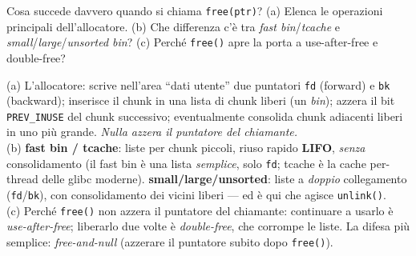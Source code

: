 \question[6]
Cosa succede davvero quando si chiama \lstinline|free(ptr)|? (a) Elenca le operazioni principali dell'allocatore. (b) Che differenza c'è tra \emph{fast bin}/\emph{tcache} e \emph{small}/\emph{large}/\emph{unsorted bin}? (c) Perché \lstinline|free()| apre la porta a use-after-free e double-free?
\begin{solution}
(a) L'allocatore: scrive nell'area ``dati utente'' due puntatori \lstinline|fd| (forward) e \lstinline|bk| (backward); inserisce il chunk in una lista di chunk liberi (un \emph{bin}); azzera il bit \lstinline|PREV_INUSE| del chunk successivo; eventualmente consolida chunk adiacenti liberi in uno più grande. \emph{Nulla azzera il puntatore del chiamante.}\\
(b) \textbf{fast bin / tcache}: liste per chunk piccoli, riuso rapido \textbf{LIFO}, \emph{senza} consolidamento (il fast bin è una lista \emph{semplice}, solo \lstinline|fd|; tcache è la cache per-thread delle glibc moderne). \textbf{small/large/unsorted}: liste a \emph{doppio} collegamento (\lstinline|fd|/\lstinline|bk|), con consolidamento dei vicini liberi --- ed è qui che agisce \lstinline|unlink()|.\\
(c) Perché \lstinline|free()| non azzera il puntatore del chiamante: continuare a usarlo è \emph{use-after-free}; liberarlo due volte è \emph{double-free}, che corrompe le liste. La difesa più semplice: \emph{free-and-null} (azzerare il puntatore subito dopo \lstinline|free()|).
\end{solution}
